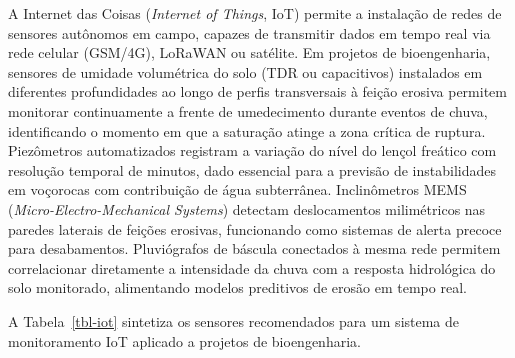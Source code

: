 \documentclass[
  portuguese,
  11pt,
  a4paper,
  open=any]{scrbook}
\begin{document}
A Internet das Coisas (\emph{Internet of Things}, IoT) permite a
instalação de redes de sensores autônomos em campo, capazes de
transmitir dados em tempo real via rede celular (GSM/4G), LoRaWAN ou
satélite. Em projetos de bioengenharia, sensores de umidade volumétrica
do solo (TDR ou capacitivos) instalados em diferentes profundidades ao
longo de perfis transversais à feição erosiva permitem monitorar
continuamente a frente de umedecimento durante eventos de chuva,
identificando o momento em que a saturação atinge a zona crítica de
ruptura. Piezômetros automatizados registram a variação do nível do
lençol freático com resolução temporal de minutos, dado essencial para a
previsão de instabilidades em voçorocas com contribuição de água
subterrânea. Inclinômetros MEMS (\emph{Micro-Electro-Mechanical
Systems}) detectam deslocamentos milimétricos nas paredes laterais de
feições erosivas, funcionando como sistemas de alerta precoce para
desabamentos. Pluviógrafos de báscula conectados à mesma rede permitem
correlacionar diretamente a intensidade da chuva com a resposta
hidrológica do solo monitorado, alimentando modelos preditivos de erosão
em tempo real.

A Tabela~\ref{tbl-iot} sintetiza os sensores recomendados para um
sistema de monitoramento IoT aplicado a projetos de bioengenharia.
\end{document}
